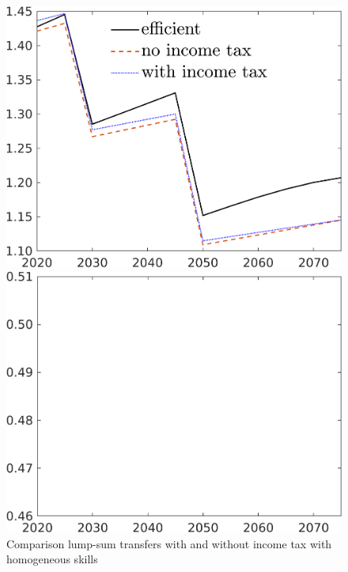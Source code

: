 \begin{figure}[h!!]
	\centering
	\caption{Comparison lump-sum transfers with and without income tax with homogeneous skills}\label{fig:lumpsum_noskill_vglNotaul}
	
	\begin{minipage}[]{0.32\textwidth}
		\includegraphics[width=1\textwidth]{../../codding_model/own_basedOnFried/optimalPol_190722_tidiedUp/figures/all_July22/C_DDCompEffOPT_T_NoTaus_pol4_spillover0_noskill1_sep1_xgrowth0_etaa0.79_lgd1_lff0.png}
	\end{minipage}
	\begin{minipage}[]{0.32\textwidth}
		\includegraphics[width=1\textwidth]{../../codding_model/own_basedOnFried/optimalPol_190722_tidiedUp/figures/all_July22/hh_DDCompEffOPT_T_NoTaus_pol4_spillover0_noskill1_sep1_xgrowth0_etaa0.79_lgd0_lff0.png}

\end{minipage}
\end{figure}
